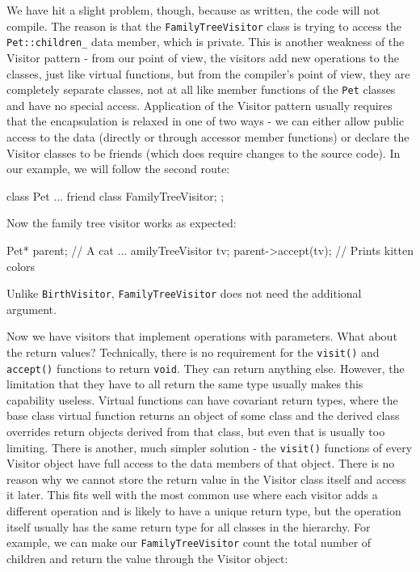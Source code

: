 We have hit a slight problem, though, because as written, the code will not compile. The reason is that the \texttt{FamilyTreeVisitor} class is trying to access the \texttt{Pet::children\_} data member, which is private. This is another weakness of the Visitor pattern - from our point of view, the visitors add new operations to the classes, just like virtual functions, but from the compiler's point of view, they are completely separate classes, not at all like member functions of the \texttt{Pet} classes and have no special access. Application of the Visitor pattern usually requires that the encapsulation is relaxed in one of two ways - we can either allow public access to the data (directly or through accessor member functions) or declare the Visitor classes to be friends (which does require changes to the source code). In our example, we will follow the second route:

\begin{code}
class Pet {
  ...
  friend class FamilyTreeVisitor;
};
\end{code}

Now the family tree visitor works as expected:

\begin{code}
Pet* parent; // A cat
...
amilyTreeVisitor tv;
parent->accept(tv); // Prints kitten colors
\end{code}

Unlike \texttt{BirthVisitor}, \texttt{FamilyTreeVisitor} does not need the additional argument.

Now we have visitors that implement operations with parameters. What about the return values? Technically, there is no requirement for the \texttt{visit()} and \texttt{accept()} functions to return \texttt{void}. They can return anything else. However, the limitation that they have to all return the same type usually makes this capability useless. Virtual functions can have covariant return types, where the base class virtual function returns an object of some class and the derived class overrides return objects derived from that class, but even that is usually too limiting. There is another, much simpler solution - the \texttt{visit()} functions of every Visitor object have full access to the data members of that object. There is no reason why we cannot store the return value in the Visitor class itself and access it later. This fits well with the most common use where each visitor adds a different operation and is likely to have a unique return type, but the operation itself usually has the same return type for all classes in the hierarchy. For example, we can make our \texttt{FamilyTreeVisitor} count the total number of children and return the value through the Visitor object:

